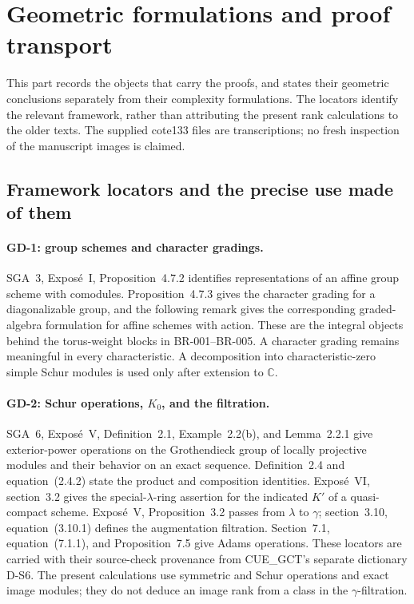 \section{Geometric formulations and proof transport}

This part records the objects that carry the proofs, and states their
geometric conclusions separately from their complexity formulations.
The locators identify the relevant framework, rather than attributing
the present rank calculations to the older texts. The supplied cote133
files are transcriptions; no fresh inspection of the manuscript images
is claimed.

\subsection{Framework locators and the precise use made of them}

\paragraph{GD-1: group schemes and character gradings.}
SGA~3, Expos\'e~I, Proposition~4.7.2 identifies representations of
an affine group scheme with comodules. Proposition~4.7.3 gives the
character grading for a diagonalizable group, and the following remark
gives the corresponding graded-algebra formulation for affine schemes
with action. These are the integral objects behind the torus-weight
blocks in BR-001--BR-005. A character grading remains meaningful in
every characteristic. A decomposition into characteristic-zero simple
Schur modules is used only after extension to $\mathbb C$.

\paragraph{GD-2: Schur operations, $K_0$, and the filtration.}
SGA~6, Expos\'e~V, Definition~2.1, Example~2.2(b), and Lemma~2.2.1
give exterior-power operations on the Grothendieck group of locally
projective modules and their behavior on an exact sequence.
Definition~2.4 and equation~(2.4.2) state the product and composition
identities. Expos\'e~VI, section~3.2 gives the special-$\lambda$-ring
assertion for the indicated $K'$ of a quasi-compact scheme.
Expos\'e~V, Proposition~3.2 passes from $\lambda$ to $\gamma$;
section~3.10, equation~(3.10.1) defines the augmentation filtration.
Section~7.1, equation~(7.1.1), and Proposition~7.5 give Adams operations.
These locators are carried with their source-check provenance from
CUE\_GCT's separate dictionary D-S6. The present calculations use
symmetric and Schur operations and exact image modules; they do not
deduce an image rank from a class in the $\gamma$-filtration.

